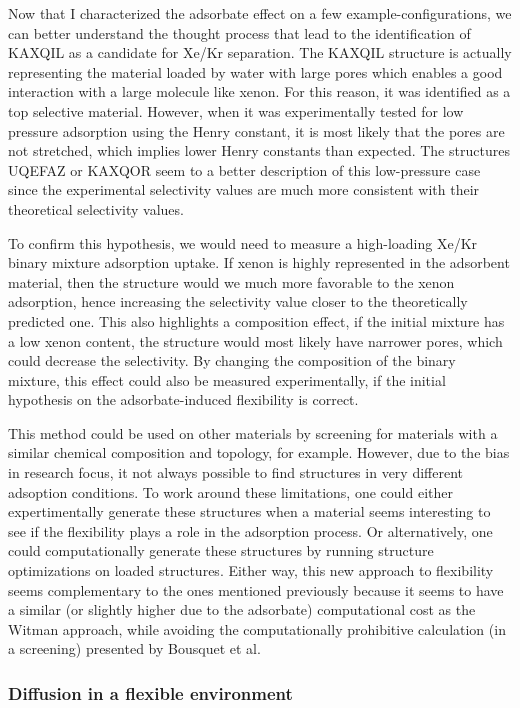 \documentclass[main]{subfiles}
\begin{document}
Now that I characterized the adsorbate effect on a few example-configurations, we can better understand the thought process that lead to the identification of KAXQIL as a candidate for Xe/Kr separation. The KAXQIL structure is actually representing the material loaded by water with large pores which enables a good interaction with a large molecule like xenon. For this reason, it was identified as a top selective material. However, when it was experimentally tested for low pressure adsorption using the Henry constant, it is most likely that the pores are not stretched, which implies lower Henry constants than expected. The structures UQEFAZ or KAXQOR seem to a better description of this low-pressure case since the experimental selectivity values are much more consistent with their theoretical selectivity values. 

To confirm this hypothesis, we would need to measure a high-loading Xe/Kr binary mixture adsorption uptake. If xenon is highly represented in the adsorbent material, then the structure would we much more favorable to the xenon adsorption, hence increasing the selectivity value closer to the theoretically predicted one. This also highlights a composition effect, if the initial mixture has a low xenon content, the structure would most likely have narrower pores, which could decrease the selectivity. By changing the composition of the binary mixture, this effect could also be measured experimentally, if the initial hypothesis on the adsorbate-induced flexibility is correct.

This method could be used on other materials by screening for materials with a similar chemical composition and topology, for example. However, due to the bias in research focus, it not always possible to find structures in very different adsoption conditions. To work around these limitations, one could either expertimentally generate these structures when a material seems interesting to see if the flexibility plays a role in the adsorption process. Or alternatively, one could computationally generate these structures by running structure optimizations on loaded structures. Either way, this new approach to flexibility seems complementary to the ones mentioned previously because it seems to have a similar (or slightly higher due to the adsorbate) computational cost as the Witman approach, while avoiding the computationally prohibitive calculation (in a screening) presented by Bousquet et al. 


\subsubsection{Diffusion in a flexible environment}
\end{document}
